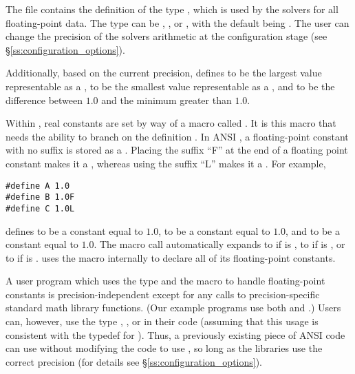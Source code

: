 %
The  file contains the definition of the type ,
which is used by the {\sundials} solvers for all floating-point data.
The type  can be , , or , with
the default being .
The user can change the precision of the {\sundials} solvers arithmetic at the
configuration stage (see \S\ref{ss:configuration_options}).

Additionally, based on the current precision,  defines 
 to be the largest value representable as a ,
 to be the smallest value representable as a , and
 to be the difference between $1.0$ and the minimum 
greater than $1.0$.

Within {\sundials}, real constants are set by way of a macro called
.  It is this macro that needs the ability to branch on the
definition .  In ANSI {\C}, a floating-point constant with no
suffix is stored as a .  Placing the suffix ``F'' at the
end of a floating point constant makes it a , whereas using the suffix
``L'' makes it a .  For example,
\begin{verbatim}
#define A 1.0
#define B 1.0F
#define C 1.0L
\end{verbatim}
defines  to be a  constant equal to $1.0$,  to be a
 constant equal to $1.0$, and  to be a  constant
equal to $1.0$.  The macro call  automatically expands to 
if  is , to  if  is ,
or to  if  is .  {\sundials} uses the
 macro internally to declare all of its floating-point constants. 

A user program which uses the type  and the  macro
to handle floating-point constants is precision-independent except for
any calls to precision-specific standard math library
functions.  (Our example programs use both  and
.)  Users can, however, use the type , , or
 in their code (assuming that this usage is consistent
with the typedef for ).  Thus, a previously existing
piece of ANSI {\C} code can use {\sundials} without modifying the code
to use , so long as the {\sundials} libraries use the
correct precision (for details see
\S\ref{ss:configuration_options}).
